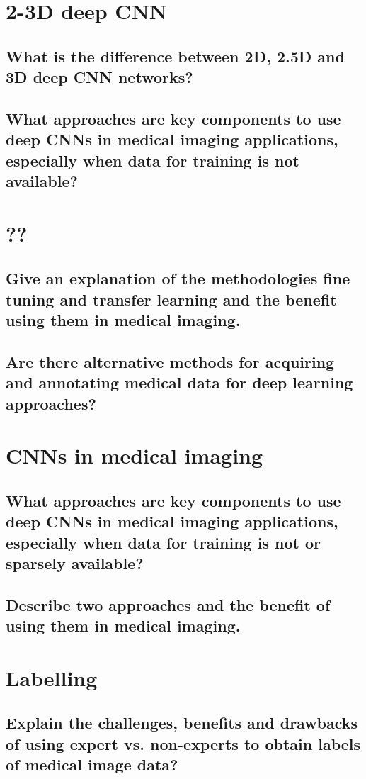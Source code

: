 \section{2-3D deep CNN}
\subsection{What is the difference between 2D, 2.5D and 3D deep CNN networks?}
\subsection{What approaches are key components to use deep CNNs in medical imaging applications, especially when data for training is not available?}

\section{??}
\subsection{Give an explanation of the methodologies fine tuning and transfer learning and the benefit using them in medical imaging. }
\subsection{Are there alternative methods for acquiring and annotating medical data for deep learning approaches?}

\section{CNNs in medical imaging}
\subsection{What approaches are key components to use deep CNNs in medical imaging applications, especially when data for training is not or sparsely available?}
\subsection{Describe two approaches and the benefit of using them in medical imaging.}

\section{Labelling}
\subsection{Explain the challenges, benefits and drawbacks of using expert vs. non-experts to obtain labels of medical image data?}
